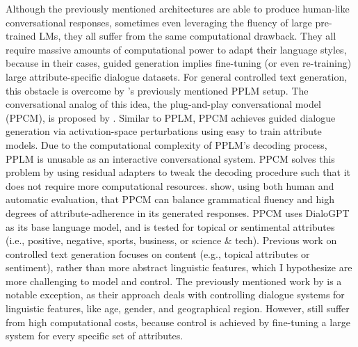 Although the previously mentioned architectures are able to produce human-like conversational responses, sometimes even leveraging the fluency of large pre-trained LMs, they all suffer from the same computational drawback. They all require massive amounts of computational power to adapt their language styles, because in their cases, guided generation implies fine-tuning (or even re-training) large attribute-specific dialogue datasets. For general controlled text generation, this obstacle is overcome by \cite{dathathri2019plug}'s previously mentioned PPLM setup. The conversational analog of this idea, the plug-and-play conversational model (PPCM), is proposed by \cite{madotto-etal-2020-plug}. Similar to PPLM, PPCM achieves guided dialogue generation via activation-space perturbations using easy to train attribute models. 
Due to the computational complexity of PPLM's decoding process, PPLM is unusable as an interactive conversational system. PPCM solves this problem by using residual adapters \citep{bapna-firat-2019-simple} to tweak the decoding procedure such that it does not require more computational resources. 
\cite{madotto-etal-2020-plug} show, using both human and automatic evaluation, that PPCM can balance grammatical fluency and high degrees of attribute-adherence in its generated responses. PPCM uses DialoGPT as its base language model, and is tested for topical or sentimental attributes (i.e., positive, negative, sports, business, or science \& tech). 
Previous work on controlled text generation focuses on content (e.g., topical attributes or sentiment), rather than more abstract linguistic features, which I hypothesize are more challenging to model and control. The previously mentioned work by \cite{zheng2019personalized} is a notable exception, as their approach deals with controlling dialogue systems for linguistic features, like age, gender, and geographical region. However, \cite{zheng2019personalized} still suffer from high computational costs, because control is achieved by fine-tuning a large system for every specific set of attributes. 

